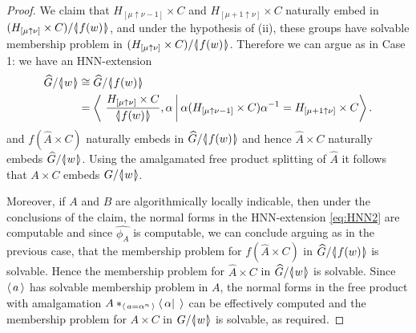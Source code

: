 \documentclass[12pt, a4paper]{amsart}
\theoremstyle{remark}
\theoremstyle{definition}
\begin{document}
\begin{proof}
We claim that $H_{[\mu \uparrow \nu-1]}\times C$ and $H_{[\mu+1 \uparrow \nu]}\times C$ naturally embed in $(H_{[\mu\uparrow \nu]}\times C)/{{\langle}{\mkern-3.7mu}{\lvert}{\mkern1.2mu}{{f(w)}}{\mkern1.2mu}{\rvert}{\mkern-3.7mu}{\rangle}}$, and under the hypothesis of (ii), these groups have solvable membership problem in $(H_{[\mu\uparrow \nu]}\times C)/{{\langle}{\mkern-3.7mu}{\lvert}{\mkern1.2mu}{{f(w)}}{\mkern1.2mu}{\rvert}{\mkern-3.7mu}{\rangle}}$. Therefore we can argue as in Case 1: we have an HNN-extension 
\begin{align}
\widehat{G}/{{\langle}{\mkern-3.7mu}{\lvert}{\mkern1.2mu}{{w}}{\mkern1.2mu}{\rvert}{\mkern-3.7mu}{\rangle}} &\cong \widehat{G}/{{\langle}{\mkern-3.7mu}{\lvert}{\mkern1.2mu}{{f(w)}}{\mkern1.2mu}{\rvert}{\mkern-3.7mu}{\rangle}}\nonumber\\
&= \left\langle \ \frac{H_{[\mu\uparrow \nu]}\times C}{{{\langle}{\mkern-3.7mu}{\lvert}{\mkern1.2mu}{{f(w)}}{\mkern1.2mu}{\rvert}{\mkern-3.7mu}{\rangle}}}, \alpha \ \vline\ \alpha(H_{[\mu \uparrow \nu-1]}\times C)\alpha^{-1}= H_{[\mu+1 \uparrow \nu]}\times C\right\rangle \label{eq:HNN2}.
\end{align}
\noindent and $f(\widehat{A}\times C)$ naturally embeds in $\widehat{G}/{{\langle}{\mkern-3.7mu}{\lvert}{\mkern1.2mu}{{f(w)}}{\mkern1.2mu}{\rvert}{\mkern-3.7mu}{\rangle}}$ and hence $\widehat{A}\times C$ naturally embeds $\widehat{G}/{{\langle}{\mkern-3.7mu}{\lvert}{\mkern1.2mu}{{w}}{\mkern1.2mu}{\rvert}{\mkern-3.7mu}{\rangle}}$. Using the amalgamated free product splitting of $\widehat{A}$ it follows that $A\times C$ embeds $G/{{\langle}{\mkern-3.7mu}{\lvert}{\mkern1.2mu}{{w}}{\mkern1.2mu}{\rvert}{\mkern-3.7mu}{\rangle}}$.

Moreover, if $A$ and $B$ are algorithmically locally indicable, then under the conclusions of the claim, the normal forms in the HNN-extension \eqref{eq:HNN2} are computable and since $\widehat{\phi_{\widehat{A}}}$ is computable, we can conclude arguing as in the previous case, that the membership problem for $f(\widehat{A}\times C)$ in $\widehat{G}/{{\langle}{\mkern-3.7mu}{\lvert}{\mkern1.2mu}{{f(w)}}{\mkern1.2mu}{\rvert}{\mkern-3.7mu}{\rangle}}$ is solvable. Hence the membership problem for $\widehat{A}\times C$ in $\widehat{G}/{{\langle}{\mkern-3.7mu}{\lvert}{\mkern1.2mu}{{w}}{\mkern1.2mu}{\rvert}{\mkern-3.7mu}{\rangle}}$ is solvable.  Since ${\langle\mkern3mu{a}\mkern3mu\rangle}$ has solvable membership problem in $A$, the normal forms in the free product with amalgamation $A*_{{\langle\mkern3mu{a=\alpha^n}\mkern3mu\rangle}}{\langle\mkern3mu{\alpha |\;}\mkern3mu\rangle}$ can be effectively computed and the membership problem for $A\times C$ in $G/{{\langle}{\mkern-3.7mu}{\lvert}{\mkern1.2mu}{{w}}{\mkern1.2mu}{\rvert}{\mkern-3.7mu}{\rangle}}$ is solvable, as required.


\end{proof}
\end{document}
